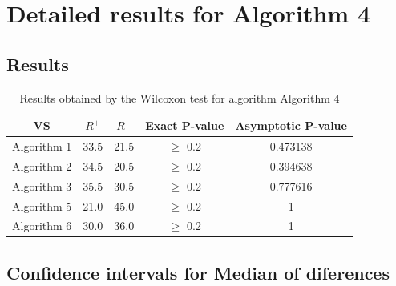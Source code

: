 \documentclass[a4paper,10pt]{article}
\begin{document}
 \clearpage 


\section{Detailed results for Algorithm 4}


\subsection{Results}

\begin{table}[!htp]
\centering\small
\begin{tabular}{
|c|c|c|c|c|}
\hline
 VS & $R^{+}$ & $R^{-}$ & Exact P-value & Asymptotic P-value \\ \hline 
Algorithm 1 & 33.5 & 21.5 & $\geq$ 0.2 & 0.473138\\ \hline 
Algorithm 2 & 34.5 & 20.5 & $\geq$ 0.2 & 0.394638\\ \hline 
Algorithm 3 & 35.5 & 30.5 & $\geq$ 0.2 & 0.777616\\ \hline 
Algorithm 5 & 21.0 & 45.0 & $\geq$ 0.2 & 1\\ \hline 
Algorithm 6 & 30.0 & 36.0 & $\geq$ 0.2 & 1\\ \hline 

\end{tabular}
\caption{Results obtained by the Wilcoxon test for algorithm Algorithm 4}
\end{table}

\subsection{Confidence intervals for Median of diferences}
\end{document}

